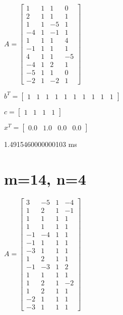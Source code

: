 \documentclass[8pt]{article}
\begin{document}
$ A =
\begin{bmatrix}
  1  &  1  &  1  &  0 \\
  2  &  1  &  1  &  1 \\
  1  &  1  & -5  &  1 \\
 -4  &  1  & -1  &  1 \\
  1  &  1  &  1  &  4 \\
 -1  &  1  &  1  &  1 \\
  4  &  1  &  1  & -5 \\
 -4  &  1  &  2  &  1 \\
 -5  &  1  &  1  &  0 \\
 -2  &  1  & -2  &  1 
\end{bmatrix}
$


$ b^T =
\begin{bmatrix}
  1  &  1  &  1  &  1  &  1  &  1  &  1  &  1  &  1  &  1 
\end{bmatrix}
$


$ c =
\begin{bmatrix}
  1  &  1  &  1  &  1 
\end{bmatrix}
$


$ x^T =
\begin{bmatrix}
  0.0 &  1.0 &  0.0 &  0.0
\end{bmatrix}
$


1.4915460000000103  ms


\section{ m=14, n=4 }



$ A =
\begin{bmatrix}
  3  & -5  &  1  & -4 \\
  1  &  2  &  1  & -1 \\
  1  &  1  &  1  &  1 \\
  1  &  1  &  1  &  1 \\
 -1  & -4  &  1  &  1 \\
 -1  &  1  &  1  &  1 \\
 -3  &  1  &  1  &  1 \\
  1  &  2  &  1  &  1 \\
 -1  & -3  &  1  &  2 \\
  1  &  1  &  1  &  1 \\
  1  &  2  &  1  & -2 \\
  1  &  2  &  1  &  1 \\
 -2  &  1  &  1  &  1 \\
 -3  &  1  &  1  &  1 
\end{bmatrix}
$
\end{document}

